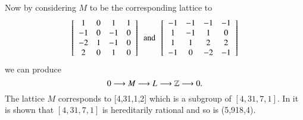 Now by considering $M$ to be the corresponding lattice to 
$$
\left[ \begin {array}{cccc} 1&0&1&1\\ -1&0&-1&0
\\ -2&1&-1&0\\ 2&0&1&0\end {array}
 \right] 
 \,\,\, \text{and} \,\,\,
 \left[ \begin {array}{cccc} -1&-1&-1&-1\\ 1&-1&1&0
\\ 1&1&2&2\\ -1&0&-2&-1
\end {array} \right] 
$$
we can produce
$$
0 \longrightarrow M_{} \longrightarrow L_{} \longrightarrow \mathbb{Z} \longrightarrow 0
.$$
The lattice $M$ corresponds to [4,31,1,2] which is a subgroup of $[4,31,7,1]$. In \cite{Nicole1} it is shown that $[4,31,7,1]$ is hereditarily rational and so is (5,918,4).
